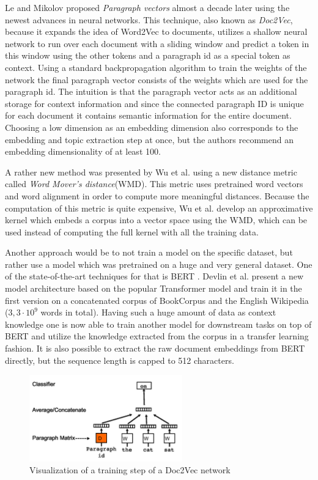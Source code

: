 Le and Mikolov \cite{leDistributedRepresentationsSentences2014} proposed \textit{Paragraph vectors} almost a decade later using the newest advances in neural networks. This technique, also known as \textit{Doc2Vec}, because it expands the idea of Word2Vec \cite{mikolovDistributedRepresentationsWords} to documents, utilizes a shallow neural network to run over each document with a sliding window and predict a token in this window using the other tokens and a paragraph id as a special token as context. Using a standard backpropagation algorithm to train the weights of the network the final paragraph vector consists of the weights which are used for the paragraph id. The intuition is that the paragraph vector acts as an additional storage for context information and since the connected paragraph ID is unique for each document it contains semantic information for the entire document. Choosing a low dimension as an embedding dimension also corresponds to the embedding and topic extraction step at once, but the authors recommend an embedding dimensionality of at least 100.

A rather new method was presented by Wu et al. \cite{wuWordMoverEmbedding2018} using a new distance metric called \textit{Word Mover's distance}(WMD). This metric uses pretrained word vectors and word alignment in order to compute more meaningful distances. Because the computation of this metric is quite expensive, Wu et al. develop an approximative kernel which embeds a corpus into a vector space using the WMD, which can be used instead of computing the full kernel with all the training data.

Another approach would be to not train a model on the specific dataset, but rather use a model which was pretrained on a huge and very general dataset. One of the state-of-the-art techniques for that is BERT \cite{devlinBERTPretrainingDeep2018}. Devlin et al. present a new model architecture based on the popular Transformer model \cite{vaswaniAttentionAllYou2017} and train it in the first version on a concatenated corpus of BookCorpus and the English Wikipedia ($3,3\cdot 10^9$ words in total).  Having such a huge amount of data as context knowledge one is now able to train another model for downstream tasks on top of BERT and utilize the knowledge extracted from the corpus in a transfer learning fashion. It is also possible to extract the raw document embeddings from BERT directly, but the sequence length is capped to 512 characters.

\begin{figure}[t]
	\centering
	\includegraphics[width=250px]{../chapters/implementation/pics/doc2vec}
	\caption{\label{pic:doc2vec} Visualization of a training step of a Doc2Vec network {\cite{wuWordMoverEmbedding2018}}}
\end{figure}

